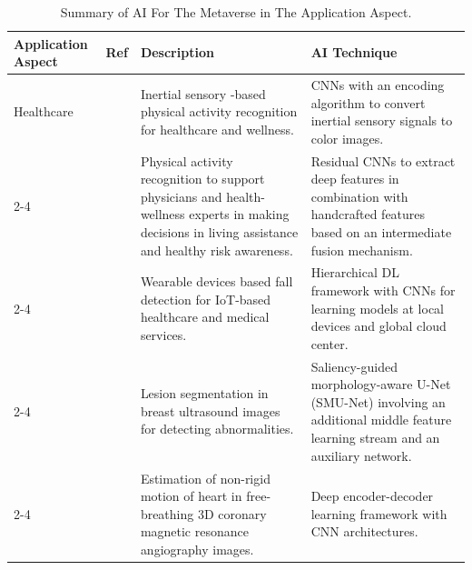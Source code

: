 \documentclass[journal]{IEEEtran}
\begin{document}
\begin{table}[ht!]
\setlength{\tabcolsep}{4pt}
\centering
\caption{Summary of AI For The Metaverse in The Application Aspect.}
\begin{tabular}{|p{2.35cm}|p{0.75cm}|p{5.75cm}|p{7.65cm}|}
\hline \hline
\textbf{Application Aspect} & \textbf{Ref} & \textbf{Description} & \textbf{AI Technique} \\ \hline \hline
Healthcare 
& \cite{hur2018iss2image}	& Inertial sensory -based physical activity recognition for healthcare and wellness.	& CNNs with an encoding algorithm to convert inertial sensory signals to color images.\\ \cline{2-4}
& \cite{huynh2021physical}	& Physical activity recognition to support physicians and health-wellness experts in making decisions in living assistance and healthy risk awareness.	& Residual CNNs to extract deep features in combination with handcrafted features based on an intermediate fusion mechanism.\\ \cline{2-4}
& \cite{qian2020wearable}	& Wearable devices based fall detection for IoT-based healthcare and medical services.	& Hierarchical DL framework with CNNs for learning models at local devices and global cloud center.\\ \cline{2-4}
& \cite{ning2021smunet}	& Lesion segmentation in breast ultrasound images for detecting abnormalities.	& Saliency-guided morphology-aware U-Net (SMU-Net) involving an additional middle feature learning stream and an auxiliary network.\\ \cline{2-4}
& \cite{qi2021nonrigid}	& Estimation of non-rigid motion of heart in free-breathing 3D coronary magnetic resonance angiography images.	& Deep encoder-decoder learning framework with CNN architectures.

\\ \hline\hline


\end{tabular}
\end{table}
\end{document}
